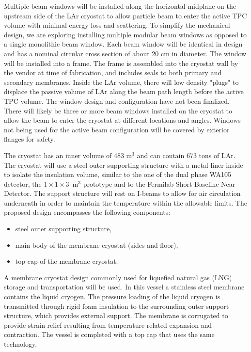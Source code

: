 Multiple beam windows will be installed along the horizontal midplane
on the upstream side of the LAr cryostat to allow particle beam to
enter the active TPC volume with minimal energy loss and scattering.
To simplify the mechanical design, we are exploring installing
multiple modular beam windows as opposed to a single monolithic beam
window. Each beam window will be identical in design and has a nominal
circular cross section of about 20 cm in diameter. The window will be
installed into a frame. The frame is assembled into the cryostat wall
by the vendor at time of fabrication, and includes seals to both
primary and secondary membranes. Inside the LAr volume, there will low
density "plugs" to displace the passive volume of LAr along the beam
path length before the active TPC volume. The window design and
configuration have not been finalized. There will likely be three or
more beam windows installed on the cryostat to allow the beam to enter
the cryostat at different locations and angles. Windows not being used
for the active beam configuration will be covered by exterior flanges
for safety.

The cryostat has an inner volume of 483 m$^3$ and can contain  673 tons of LAr.
%
%
The cryostat will use a steel outer supporting structure with a metal liner inside to isolate the insulation volume, similar to the one of the dual phase WA105 detector, the $1\times1\times3$~m$^3$ prototype and to the Fermilab Short-Baseline Near Detector. 
The support structure will rest on I-beams to allow for air circulation underneath in order to maintain the temperature within the allowable limits. The proposed design encompasses the following components:
%
\begin{itemize}
\item steel outer supporting structure,
\item main body of the membrane cryostat (sides and floor), 
\item top cap of the membrane cryostat.
\end{itemize}
%
A membrane cryostat design commonly used for liquefied natural gas (LNG) storage and transportation will be used. In this vessel a stainless steel membrane contains the liquid cryogen. The pressure loading of the liquid cryogen is transmitted through rigid foam insulation to the surrounding outer support structure, which provides external support. The membrane is corrugated to provide strain relief resulting from temperature related expansion and contraction. The vessel is completed with a top cap that uses the same technology.

